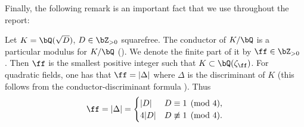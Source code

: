 Finally, the following remark is an important fact that we use throughout the report:

\begin{rem}\label{conductor}
    Let $K = \bQ(\sqrt{D})$, $D \in \bZ_{>0}$ squarefree. The conductor of $K / \bQ$ is a particular modulus for $K / \bQ$ (\cite[Ch VI, Definition 6.4]{Neukirch}). We denote the finite part of it by $\ff \in \bZ_{>0}$ . Then $\ff$ is the smallest positive integer such that $K \subset \bQ(\zeta_{\ff})$. For quadratic fields, one has that $\ff = |\Delta|$ where $\Delta$ is the discriminant of $K$ (this follows from the conductor-discriminant formula \cite[Ch VII, (11.9)]{Neukirch}). Thus
\[ \ff = |\Delta| =  \begin{cases} |D| & D \equiv 1 \pmod 4, \\ 4|D| & D \not\equiv 1 \pmod 4. \end{cases} \]
\end{rem}
